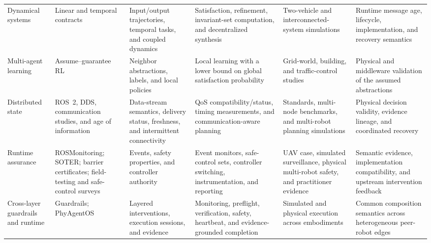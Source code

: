\begin{table}[t]
\begin{tabularx}{\textwidth}{@{}P{0.105\textwidth}P{0.16\textwidth}P{0.14\textwidth}P{0.21\textwidth}P{0.16\textwidth}Y@{}}
    Dynamical systems & Linear and temporal contracts \cite{sharf2021dynamical,chen2019invariance,liu2022stlcontracts} & Input/output trajectories, temporal tasks, and coupled dynamics & Satisfaction, refinement, invariant-set computation, and decentralized synthesis & Two-vehicle and interconnected-system simulations & Runtime message age, lifecycle, implementation, and recovery semantics \\
    Multi-agent learning & Assume--guarantee RL \cite{kazemi2024agrl} & Neighbor abstractions, labels, and local policies & Local learning with a lower bound on global satisfaction probability & Grid-world, building, and traffic-control studies & Physical and middleware validation of the assumed abstractions \\
    Distributed state & ROS~2, DDS, communication studies, and age of information \cite{macenski2022ros2,omg2015dds,gielis2022communications,kronauer2021latency,kaul2012aoi,silva2026probabilistic} & Data-stream semantics, delivery status, freshness, and intermittent connectivity & QoS compatibility/status, timing measurements, and communication-aware planning & Standards, multi-node benchmarks, and multi-robot planning simulations & Physical decision validity, evidence lineage, and coordinated recovery \\
    Runtime assurance & ROSMonitoring; SOTER; barrier certificates; field-testing and safe-control surveys \cite{ghaffari2024rosmonitoring,shivakumar2020soterros,wang2017barrier,caldas2024rvft,garg2024safecontrol} & Events, safety properties, and controller authority & Event monitors, safe-control sets, controller switching, instrumentation, and reporting & UAV case, simulated surveillance, physical multi-robot safety, and practitioner evidence & Semantic evidence, implementation compatibility, and upstream intervention feedback \\
    Cross-layer guardrails and runtime & Guardrails; PhyAgentOS \cite{kim2026guardrails,liu2026phyagentos} & Layered interventions, execution sessions, and evidence & Monitoring, preflight, verification, safety, heartbeat, and evidence-grounded completion & Simulated and physical execution across embodiments & Common composition semantics across heterogeneous peer-robot edges \\
    \bottomrule
  \end{tabularx}
\end{table}
